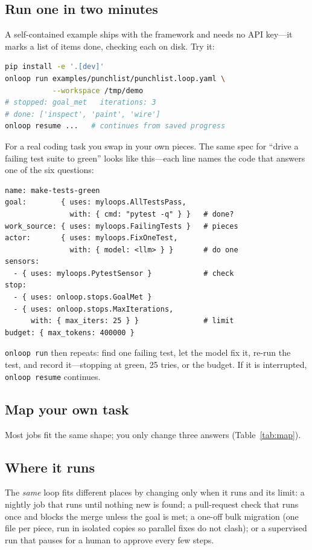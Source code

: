 \documentclass[10pt,twocolumn,letterpaper]{article}
\begin{document}
\subsection{Run one in two minutes}
A self-contained example ships with the framework and needs no API key---it
marks a list of items done, checking each on disk. Try it:
\begin{lstlisting}[language=bash]
pip install -e '.[dev]'
onloop run examples/punchlist/punchlist.loop.yaml \
           --workspace /tmp/demo
# stopped: goal_met   iterations: 3
# done: ['inspect', 'paint', 'wire']
onloop resume ...   # continues from saved progress
\end{lstlisting}
For a real coding task you swap in your own pieces. The same spec for ``drive a
failing test suite to green'' looks like this---each line names the code that
answers one of the six questions:
\begin{lstlisting}
name: make-tests-green
goal:        { uses: myloops.AllTestsPass,
               with: { cmd: "pytest -q" } }   # done?
work_source: { uses: myloops.FailingTests }   # pieces
actor:       { uses: myloops.FixOneTest,
               with: { model: <llm> } }       # do one
sensors:
  - { uses: myloops.PytestSensor }            # check
stop:
  - { uses: onloop.stops.GoalMet }
  - { uses: onloop.stops.MaxIterations,
      with: { max_iters: 25 } }               # limit
budget: { max_tokens: 400000 }
\end{lstlisting}
\texttt{onloop run} then repeats: find one failing test, let the model fix it,
re-run the test, and record it---stopping at green, 25 tries, or the budget. If
it is interrupted, \texttt{onloop resume} continues.

\subsection{Map your own task}
Most jobs fit the same shape; you only change three answers (Table~\ref{tab:map}).

\subsection{Where it runs}
The \emph{same} loop fits different places by changing only when it runs and its
limit: a nightly job that runs until nothing new is found; a pull-request check
that runs once and blocks the merge unless the goal is met; a one-off bulk
migration (one file per piece, run in isolated copies so parallel fixes do not
clash); or a supervised run that pauses for a human to approve every few steps.
\end{document}
